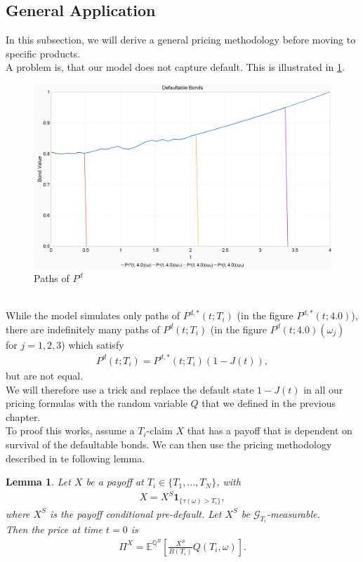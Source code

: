 \documentclass[12pt]{article}
\newtheorem{lemma}[theorem]{Lemma}
\begin{document}
	\subsection{General Application}
	In this subsection, we will derive a general pricing methodology before moving to specific products.\\
	A problem is, that our model does not capture default. This is illustrated in \cref{fig:survivalprobabilityvisualisation}.
	\begin{figure}[h]
		\centering
		\includegraphics[width=\linewidth]{SurvivalProbability}
		\caption{Paths of $P^d$}
		\label{fig:survivalprobabilityvisualisation}
	\end{figure}
	\\While the model simulates only paths of $P^{d,*}(t; T_i)$ (in the figure $P^{d,*}(t; 4.0)$), there are indefinitely many paths of $P^d(t;T_i)$ (in the figure $P^d(t; 4.0)(\omega_j)$ for $j=1,2,3$) which satisfy
	\begin{align*}
		P^d(t;T_i) = P^{d,*}(t;T_i)(1 - J(t)),
	\end{align*} 
	but are not equal.\\
	We will therefore use a trick and replace the default state $1-J(t)$ in all our pricing formulas with the random variable $Q$ that we defined in the previous chapter. \\
	To proof this works, assume a $T_i$-claim $X$ that has a payoff that is dependent on survival of the defaultable bonds. We can then use the pricing methodology described in te following lemma.
	\begin{lemma}
		Let $X$ be a payoff at $T_i \in \{T_1, ..., T_N\}$, with
		\begin{align*}
			X = X^S \mathbf{1}_{\{\tau(\omega) > T_i\}},
		\end{align*}
		where $X^S$ is the payoff conditional pre-default. Let $X^S$ be $\mathcal{G}_{T_i}$-measurable.\\
		Then the price at time $t=0$ is
		\begin{align*}
			\Pi^X = \mathbb{E}^{\mathbb{Q}^B}\left[ \frac{X^S}{B(T_i)} Q\left(T_i,\omega\right) \right].
		\end{align*}
	\end{lemma}
\end{document}
